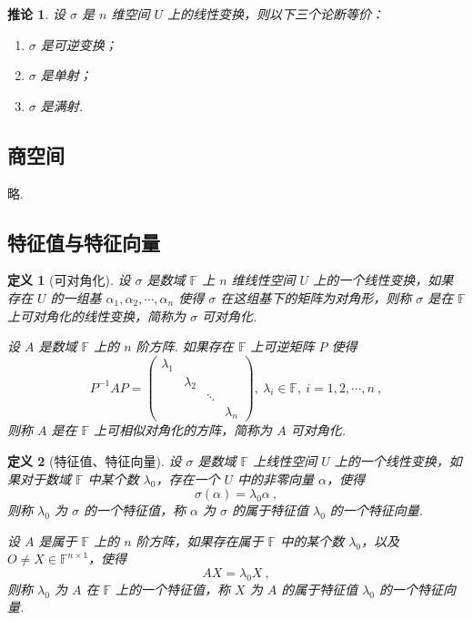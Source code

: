 \documentclass[zihao=-4,UTF8,linespread=1.8,nothm]{aytony_base}
\newtheorem*{corollary}{\indent 推论}
\newtheorem{definition}{\indent 定义}[subsection]
\begin{document}
\begin{corollary}
    设 $\sigma$ 是 $n$ 维空间 $U$ 上的线性变换，则以下三个论断等价：
    \begin{enumerate}[nosep]
        \item $\sigma$ 是可逆变换；
        \item $\sigma$ 是单射；
        \item $\sigma$ 是满射.
    \end{enumerate}
\end{corollary}

\subsection{商空间}

略.

\subsection{特征值与特征向量}

\begin{definition}[可对角化]
    设 $\sigma$ 是数域 $\mathbb{F}$ 上 $n$ 维线性空间 $U$ 上的一个线性变换，如果存在 $U$ 的一组基 ${\alpha}_1, {\alpha}_2, \cdots, {\alpha}_{n}$ 使得 $\sigma$ 在这组基下的矩阵为对角形，则称 $\sigma$ 是在 $\mathbb{F}$ 上可对角化的线性变换，简称为 $\sigma$ 可对角化.

    设 $A$ 是数域 $\mathbb{F}$ 上的 $n$ 阶方阵. 如果存在 $\mathbb{F}$ 上可逆矩阵 $P$ 使得 $$
        P^{-1}AP = \left(
        \begin{matrix}
                \lambda_1 &           &        &           \\
                          & \lambda_2 &        &           \\
                          &           & \ddots &           \\
                          &           &        & \lambda_n
            \end{matrix}
        \right),\ \lambda_i \in \mathbb{F},\ i = 1, 2, \cdots, n\ ,
    $$ 则称 $A$ 是在 $\mathbb{F}$ 上可相似对角化的方阵，简称为 $A$ 可对角化.
\end{definition}

\begin{definition}[特征值、特征向量]
    设 $\sigma$ 是数域 $\mathbb{F}$ 上线性空间 $U$ 上的一个线性变换，如果对于数域 $\mathbb{F}$ 中某个数 $\lambda_{0}$，存在一个 $U$ 中的非零向量 $\alpha$，使得 $$
        \sigma(\alpha) = \lambda_0 \alpha\ ,
    $$ 则称 $\lambda_0$ 为 $\sigma$ 的一个特征值，称 $\alpha$ 为 $\sigma$ 的属于特征值 $\lambda_0$ 的一个特征向量.

    设 $A$ 是属于 $\mathbb{F}$ 上的 $n$ 阶方阵，如果存在属于 $\mathbb{F}$ 中的某个数 $\lambda_0$，以及 $O \neq X \in \mathbb{F}^{n \times 1}$，使得 $$
        AX = \lambda_0 X\ ,
    $$ 则称 $\lambda_0$ 为 $A$ 在 $\mathbb{F}$ 上的一个特征值，称 $X$ 为 $A$ 的属于特征值 $\lambda_0$ 的一个特征向量.
\end{definition}
\end{document}
